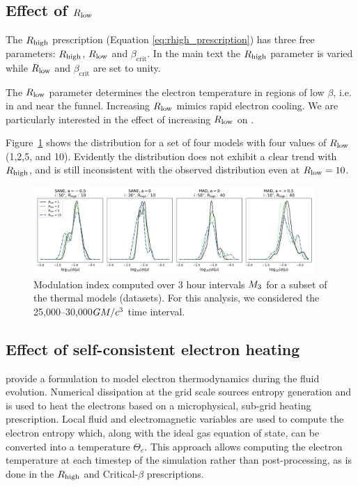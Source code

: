 \subsection{Effect of \texorpdfstring{$R_\mathrm{low}$}{Rlow}}

The $R_\mathrm{high}$ prescription (Equation \ref{eq:rhigh_prescription}) has three free parameters: $R_\mathrm{high}$, $R_\mathrm{low}$ and $\beta_\mathrm{crit}$.
In the main text the $R_\mathrm{high}$ parameter is varied while $R_\mathrm{low}$ and $\beta_\mathrm{crit}$ are set to unity.

The $R_\mathrm{low}$ parameter determines the electron temperature in regions of low $\beta$, i.e. in and near the funnel.
Increasing $R_\mathrm{low}$ mimics rapid electron cooling.
We are particularly interested in the effect of increasing $R_\mathrm{low}$ on .

Figure~\ref{fig:mi_rlow} shows the  distribution for a set of four \kharma models with four values of $R_\mathrm{low}$ (1,2,5, and 10).
Evidently the  distribution does not exhibit a clear trend with $R_\mathrm{high}$, and is still inconsistent with the observed distribution even at $R_\mathrm{low} = 10$.

\begin{figure}
  \centering
  \includegraphics[width=0.95\textwidth]{figures/mi_rlow_select_models.png}
  \caption{Modulation index computed over 3 hour intervals $M_{3}$ for a subset of the thermal models (\kharma datasets).
For this analysis, we considered the 25,000--30,000$GM/c^3$ time interval.}
  \label{fig:mi_rlow}
\end{figure}

\subsection{Effect of self-consistent electron heating}

\citealt{10.1093/mnras/stv2084} provide a formulation to model electron thermodynamics during the fluid evolution.
Numerical dissipation at the grid scale sources entropy generation and is used to heat the electrons based on a microphysical, sub-grid heating prescription.
Local fluid and electromagnetic variables are used to compute the electron entropy which, along with the ideal gas equation of state, can be converted into a temperature $\Theta_{e}$.
This approach allows computing the electron temperature at each timestep of the simulation rather than post-processing, as is done in the $R_\mathrm{high}$ and Critical-$\beta$ prescriptions.

